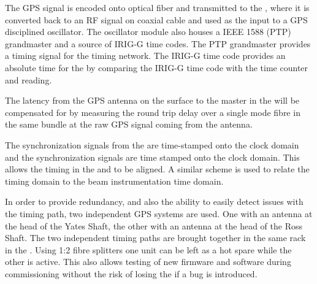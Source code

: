 \documentclass{article}
\begin{document}
The GPS signal is encoded onto optical fiber and transmitted to the
, where it is converted back to an RF signal on coaxial cable and
used as the input to a GPS disciplined oscillator. The oscillator module
also houses a IEEE 1588 (PTP) grandmaster and a source of IRIG-G time codes. The PTP grandmaster provides a timing signal for the  
timing network. The IRIG-G time code provides an absolute time for the  by comparing the IRIG-G time code with the  time counter and reading.

The latency from the GPS antenna on the surface to the  master in
the  will be compensated for by measuring the round trip delay over a single mode fibre in the same bundle at the raw GPS signal coming from the antenna. 

The  synchronization signals from the   are
time-stamped onto the  clock domain and the  synchronization
signals are time stamped onto the  clock domain. This allows
the timing in the  and   to be
aligned. A similar scheme is used to relate the 
 timing domain to the beam instrumentation
 time domain.

In order to provide redundancy, and also the ability to easily detect
issues with the timing path, two independent GPS systems are used. One
with an antenna at the head of the Yates Shaft, the other with an
antenna at the head of the Ross Shaft. The two independent timing
paths are brought together in the same rack in the . Using 1:2
fibre splitters one  unit can be left as a hot spare while the
other is active. This also allows testing of new firmware and software
during commissioning without the risk of losing the  if a bug is
introduced.


\end{document}
